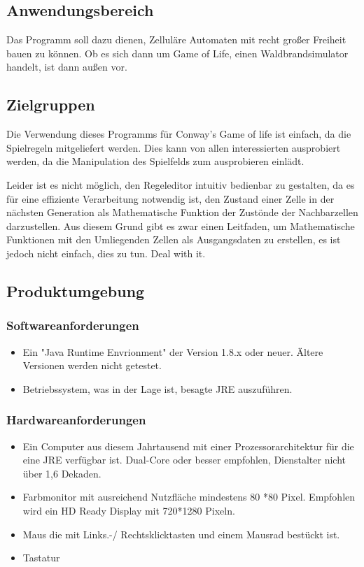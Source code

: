 \documentclass[11pt,a4paper]{article}
\begin{document}
\subsection{Anwendungsbereich}
Das Programm soll dazu dienen, Zelluläre Automaten mit recht großer Freiheit bauen zu können. Ob es sich dann um Game of Life, einen Waldbrandsimulator handelt, ist dann außen vor.
\subsection{Zielgruppen}
Die Verwendung dieses Programms für Conway's Game of life ist einfach, da die Spielregeln mitgeliefert werden. Dies kann von allen interessierten ausprobiert werden, da die Manipulation des Spielfelds zum ausprobieren einlädt.

Leider ist es nicht möglich, den Regeleditor intuitiv bedienbar zu gestalten, da es für eine effiziente Verarbeitung notwendig ist, den Zustand einer Zelle in der nächsten Generation als Mathematische Funktion der Zustönde der Nachbarzellen darzustellen. Aus diesem Grund gibt es zwar einen Leitfaden, um Mathematische Funktionen mit den Umliegenden Zellen als Ausgangsdaten zu erstellen, es ist jedoch nicht einfach, dies zu tun. Deal with it.

\subsection{Produktumgebung}

\subsubsection{Softwareanforderungen}
\begin{itemize}
    \item Ein "Java Runtime Envrionment" der Version 1.8.x oder neuer. Ältere Versionen werden nicht getestet.
    \item Betriebssystem, was in der Lage ist, besagte JRE auszuführen. 
\end{itemize}

\subsubsection{Hardwareanforderungen}


\begin{itemize}
    \item Ein Computer aus diesem Jahrtausend mit einer Prozessorarchitektur für die eine JRE verfügbar ist. Dual-Core oder besser empfohlen, Dienstalter nicht über 1,6 Dekaden.
    \item Farbmonitor mit ausreichend Nutzfläche mindestens 80 *80 Pixel. Empfohlen wird ein HD Ready Display mit 720*1280 Pixeln.
    \item Maus die mit Links.-/ Rechtsklicktasten und einem Mausrad bestückt ist. 
    \item Tastatur
\end{itemize}
\end{document}
